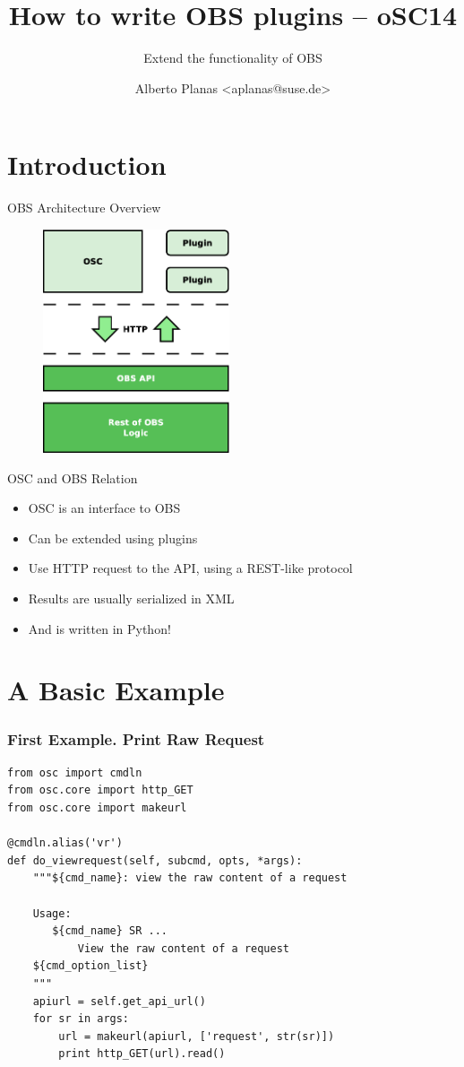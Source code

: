 \documentclass{beamer}
\author{Alberto Planas <aplanas@suse.de>\newline {\small openSUSE Team}}
\title{How to write OBS plugins -- oSC14}
\subtitle{Extend the functionality of OBS}
\begin{document}
\begin{frame}[t,plain]
  \titlepage
\end{frame}


\section{Introduction}

\begin{frame}{OBS Architecture Overview}
  \begin{figure}
    \includegraphics[width=5.5cm]{obsplugins.eps}
  \end{figure}
\end{frame}

\begin{frame}{OSC and OBS Relation}
  \begin{itemize}
  \item OSC is an interface to OBS
  \item Can be extended using plugins
  \item Use HTTP request to the API, using a REST-like protocol
  \item Results are usually serialized in XML
  \item And is written in Python!
  \end{itemize}
\end{frame}


\section{A Basic Example}

\begin{frame}[fragile]
  \frametitle{First Example. Print Raw Request}
  \lstset{style=mypython}
  \begin{lstlisting}
from osc import cmdln
from osc.core import http_GET
from osc.core import makeurl

@cmdln.alias('vr')
def do_viewrequest(self, subcmd, opts, *args):
    """${cmd_name}: view the raw content of a request

    Usage:
       ${cmd_name} SR ...
           View the raw content of a request
    ${cmd_option_list}
    """
    apiurl = self.get_api_url()
    for sr in args:
        url = makeurl(apiurl, ['request', str(sr)])
        print http_GET(url).read()
  \end{lstlisting}
\end{frame}
\end{document}
